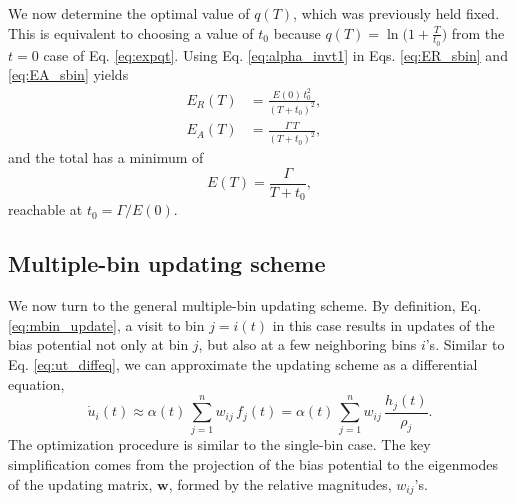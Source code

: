 \documentclass[preprint, superscriptaddress, floatfix]{revtex4-1}
\newcommand{\Err}{E}
\begin{document}
We now determine the optimal value of $q(T)$,
which was previously held fixed.
%
This is equivalent to choosing a value of $t_0$
because $q(T) = \ln\bigl(1 + \frac{T}{t_0}\bigr)$
from the $t = 0$ case of Eq. \eqref{eq:expqt}.
%
Using Eq. \eqref{eq:alpha_invt1} in
Eqs. \eqref{eq:ER_sbin} and \eqref{eq:EA_sbin}
yields
\begin{align}
  \Err_R(T)
  &= \frac{ \Err(0) \, t_0^2 } { (T + t_0)^2 }
  ,
  &
  \\
  \Err_A(T)
  &= \frac{ \Gamma \, T } { (T + t_0)^2 }
  ,
\end{align}
%
and the total has a minimum of
\begin{equation}
  \Err(T)
  =
  \frac{ \Gamma } { T + t_0 }
  ,
  \label{eq:Emin_sbin}
\end{equation}
%
reachable at $t_0 = \Gamma /\Err(0)$.
%
%



\subsection{\label{sec:multiple-bin}
Multiple-bin updating scheme}



We now turn to the general multiple-bin updating scheme.
%
By definition, Eq. \eqref{eq:mbin_update},
a visit to bin $j = i(t)$ in this case results in updates of the bias potential
not only at bin $j$, but also at a few neighboring bins $i$'s.
%
Similar to Eq. \eqref{eq:ut_diffeq},
we can approximate the updating scheme
as a differential equation,
%
\begin{equation}
  \dot u_i(t)
  \approx
  \alpha(t) \,
  \sum_{j=1}^n w_{ij} \, f_j(t)
  =
  \alpha(t) \,
  \sum_{j=1}^n w_{ij} \, \frac{ h_j(t) } { \rho_j }
  .
  \label{eq:ut_diffeq_mbin}
\end{equation}
%
The optimization procedure is similar to
the single-bin case.
%
The key simplification comes from the
projection of the bias potential to the eigenmodes
of the updating matrix, $\mathbf w$,
formed by the relative magnitudes, $w_{ij}$'s.
\end{document}

